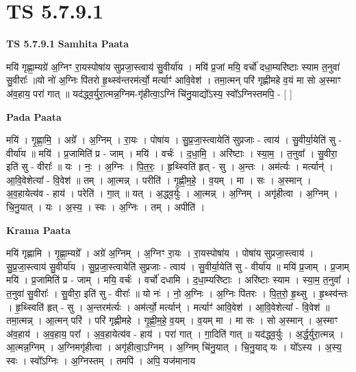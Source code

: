 \documentclass[17pt]{extarticle}
\begin{document}
\section{ TS 5.7.9.1 }

\textbf{TS 5.7.9.1 } \newline
\textbf{Samhita Paata} \newline

मयि॑ गृह्णा॒म्यग्रे॑ अ॒ग्निꣳ रा॒यस्पोषा॑य सुप्रजा॒स्त्वाय॑ सु॒वीर्या॑य । मयि॑ प्र॒जां मयि॒ वर्चो॑ दधा॒म्यरि॑ष्टाः स्याम त॒नुवा॑ सु॒वीराः᳚ ॥यो नो॑ अ॒ग्निः पि॑तरो हृ॒थ्स्व॑न्तरम॑र्त्यो॒ मर्त्याꣳ॑ आवि॒वेश॑ । तमा॒त्मन् परि॑ गृह्णीमहे व॒यं मा सो अ॒स्माꣳ अ॑व॒हाय॒ परा॑ गात् ॥ यद॑द्ध्व॒र्युरा॒त्मन्न॒ग्निम-गृ॑हीत्वा॒ऽग्निं चि॑नु॒याद्यो᳚ऽस्य॒ स्वो᳚ऽग्निस्तमपि॒ - [  ] \newline

\textbf{Pada Paata} \newline

मयि॑ । गृ॒ह्णा॒मि॒ । अग्रे᳚ । अ॒ग्निम् । रा॒यः । पोषा॑य । सु॒प्र॒जा॒स्त्वायेति॑ सुप्रजाः - त्वाय॑ । सु॒वीर्या॒येति॑ सु - वीर्या॑य ॥ मयि॑ । प्र॒जामिति॑ प्र - जाम् । मयि॑ । वर्चः॑ । द॒धा॒मि॒ । अरि॑ष्टाः । स्या॒म॒ । त॒नुवा᳚ । सु॒वीरा॒ इति॑ सु - वीराः᳚ ॥ यः । नः॒ । अ॒ग्निः । पि॒त॒रः॒ । हृ॒थ्स्विति॑ हृत् - सु । अ॒न्तः । अम॑र्त्यः । मर्त्यान्॑ । आ॒वि॒वेशेत्या᳚ - वि॒वेश॑ ॥ तम् । आ॒त्मन्न् । परीति॑ । गृ॒ह्णी॒म॒हे॒ । व॒यम् । मा । सः । अ॒स्मान् । अ॒व॒हायेत्य॑व - हाय॑ । परेति॑ । गा॒त् ॥ यत् । अ॒द्ध्व॒र्युः । आ॒त्मन्न् । अ॒ग्निम् । अगृ॑हीत्वा । अ॒ग्निम् । चि॒नु॒यात् । यः । अ॒स्य॒ । स्वः । अ॒ग्निः । तम् । अपीति॑ ।  \newline


\textbf{Krama Paata} \newline

मयि॑ गृह्णामि । गृ॒ह्णा॒म्यग्रे᳚ । अग्रे॑ अ॒ग्निम् । अ॒ग्निꣳ रा॒यः । रा॒यस्पोषा॑य । पोषा॑य सुप्रजा॒स्त्वाय॑ । सु॒प्र॒जा॒स्त्वाय॑ सु॒वीर्या॑य । सु॒प्र॒जा॒स्त्वायेति॑ सुप्रजाः - त्वाय॑ । सु॒वीर्या॒येति॑ सु - वीर्या॑य ॥ मयि॑ प्र॒जाम् । प्र॒जाम् मयि॑ । प्र॒जामिति॑ प्र - जाम् । मयि॒ वर्चः॑ । वर्चो॑ दधामि । द॒धा॒म्यरि॑ष्टाः । अरि॑ष्टाः स्याम । स्या॒म॒ त॒नुवा᳚ । त॒नुवा॑ सु॒वीराः᳚ । सु॒वीरा॒ इति॑ सु - वीराः᳚ ॥ यो नः॑ । नो॒ अ॒ग्निः । अ॒ग्निः पि॑तरः । पि॒त॒रो॒ हृ॒थ्सु । हृ॒थ्स्व॑न्तः । हृ॒थ्स्विति॑ हृत् - सु । अ॒न्तरम॑र्त्यः । अम॑र्त्यो॒ मर्त्यान्॑ । मर्त्याꣳ॑ आवि॒वेश॑ । आ॒वि॒वेशेत्या᳚ - वि॒वेश॑ ॥ तमा॒त्मन्न् । आ॒त्मन् परि॑ । परि॑ गृह्णीमहे । गृ॒ह्णी॒म॒हे॒ व॒यम् । व॒यम् मा । मा सः । सो अ॒स्मान् । अ॒स्माꣳ अ॑व॒हाय॑ । अ॒व॒हाय॒ परा᳚ । अ॒व॒हायेत्य॑व - हाय॑ । परा॑ गात् । गा॒दिति॑ गात् ॥ यद॑द्ध्व॒र्युः । अ॒र्द्ध॒र्युरा॒त्मन्न् । आ॒त्मन्न॒ग्निम् । अ॒ग्निमगृ॑हीत्वा । अगृ॑हीत्वा॒ऽग्निम् । अ॒ग्निम् चि॑नु॒यात् । चि॒नु॒याद् यः । यो᳚ऽस्य । अ॒स्य॒ स्वः । स्वो᳚ऽग्निः । अ॒ग्निस्तम् । तमपि॑ । अपि॒ यज॑मानाय \newline
\end{document}
